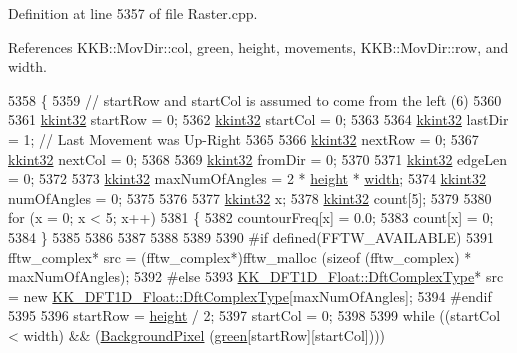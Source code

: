 Definition at line 5357 of file Raster.\+cpp.



References K\+K\+B\+::\+Mov\+Dir\+::col, green, height, movements, K\+K\+B\+::\+Mov\+Dir\+::row, and width.


\begin{DoxyCode}
5358 \{
5359   \textcolor{comment}{// startRow and startCol is assumed to come from the left (6)}
5360 
5361   \hyperlink{namespace_k_k_b_a8fa4952cc84fda1de4bec1fbdd8d5b1b}{kkint32}  startRow = 0;
5362   \hyperlink{namespace_k_k_b_a8fa4952cc84fda1de4bec1fbdd8d5b1b}{kkint32}  startCol = 0;
5363 
5364   \hyperlink{namespace_k_k_b_a8fa4952cc84fda1de4bec1fbdd8d5b1b}{kkint32}  lastDir = 1; \textcolor{comment}{// Last Movement was Up-Right}
5365 
5366   \hyperlink{namespace_k_k_b_a8fa4952cc84fda1de4bec1fbdd8d5b1b}{kkint32}  nextRow = 0;
5367   \hyperlink{namespace_k_k_b_a8fa4952cc84fda1de4bec1fbdd8d5b1b}{kkint32}  nextCol = 0;
5368 
5369   \hyperlink{namespace_k_k_b_a8fa4952cc84fda1de4bec1fbdd8d5b1b}{kkint32}  fromDir = 0;
5370 
5371   \hyperlink{namespace_k_k_b_a8fa4952cc84fda1de4bec1fbdd8d5b1b}{kkint32}  edgeLen = 0;
5372 
5373   \hyperlink{namespace_k_k_b_a8fa4952cc84fda1de4bec1fbdd8d5b1b}{kkint32}  maxNumOfAngles = 2 * \hyperlink{class_k_k_b_1_1_raster_af39ff189de4fbb6de98392e187efafb7}{height} * \hyperlink{class_k_k_b_1_1_raster_ae0bcc103e191c3421d7692dc69ceb554}{width};
5374   \hyperlink{namespace_k_k_b_a8fa4952cc84fda1de4bec1fbdd8d5b1b}{kkint32}  numOfAngles = 0;
5375 
5376 
5377   \hyperlink{namespace_k_k_b_a8fa4952cc84fda1de4bec1fbdd8d5b1b}{kkint32}  x;
5378   \hyperlink{namespace_k_k_b_a8fa4952cc84fda1de4bec1fbdd8d5b1b}{kkint32}  count[5];
5379 
5380   \textcolor{keywordflow}{for}  (x = 0; x < 5; x++)
5381   \{
5382     countourFreq[x] = 0.0;
5383     count[x] = 0;
5384   \}
5385 
5386 
5387 
5388 
5389 
5390 \textcolor{preprocessor}{  #if defined(FFTW\_AVAILABLE)}
5391     fftw\_complex*  src = (fftw\_complex*)fftw\_malloc (\textcolor{keyword}{sizeof} (fftw\_complex) * maxNumOfAngles);
5392 \textcolor{preprocessor}{  #else}
5393     \hyperlink{class_k_k_b_1_1_k_k___d_f_t1_d_a4cbc827157dd30ddec2d3753e552a827}{KK\_DFT1D\_Float::DftComplexType}*  src = \textcolor{keyword}{new} 
      \hyperlink{class_k_k_b_1_1_k_k___d_f_t1_d_a4cbc827157dd30ddec2d3753e552a827}{KK\_DFT1D\_Float::DftComplexType}[maxNumOfAngles];
5394 \textcolor{preprocessor}{  #endif}
5395 
5396   startRow = \hyperlink{class_k_k_b_1_1_raster_af39ff189de4fbb6de98392e187efafb7}{height} / 2;
5397   startCol = 0;
5398 
5399   \textcolor{keywordflow}{while}  ((startCol < width)  &&  (\hyperlink{class_k_k_b_1_1_raster_a0756fb5530274d5e28858d3e1633d595}{BackgroundPixel} (\hyperlink{class_k_k_b_1_1_raster_a2d2238911145488e226cd2e34fc8448c}{green}[startRow][startCol])))

\end{DoxyCode}
